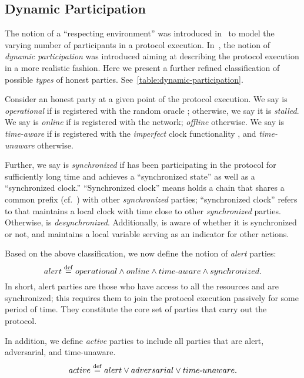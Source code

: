 \subsection{Dynamic Participation}
\label{subsec:dynamic-participation}

The notion of a ``respecting environment'' was introduced in~\cite{C:GarKiaLeo17} to model the varying number of participants in a protocol execution.
%
In~\cite{CCS:BGKRZ18,EC:BGKRZ21}, the notion of \emph{dynamic participation} was introduced aiming at describing the protocol execution in a more realistic fashion.
%
Here we present a further refined classification of possible \emph{types} of honest parties.
%
See~\cref{table:dynamic-participation}.



Consider an honest party \party at a given point of the protocol execution.
%
We say \party is \emph{operational} if \party is registered with the random oracle \funcRO; otherwise, we say it is \emph{stalled}.
%
We say \party is \emph{online} if \party is registered with the network; \emph{offline} otherwise.
%
We say \party is \emph{time-aware} if \party is registered with the \emph{imperfect} clock functionality \funcImpClock, and \emph{time-unaware} otherwise.

Further, we say \party is \emph{synchronized} if \party has been participating in the protocol for sufficiently long time and achieves a ``synchronized state'' as well as a ``synchronized clock.''
%
``Synchronized clock'' means \party holds a chain that shares a common prefix (cf.~\cite{EC:GarKiaLeo15}) with other \emph{synchronized} parties; ``synchronized clock'' refers to that \party maintains a local clock with time close to other \emph{synchronized} parties.
%
Otherwise, \party is \emph{desynchronized}.
%
Additionally, \party is aware of whether it is synchronized or not, and maintains a local variable \isSync serving as an indicator for other actions.

Based on the above classification, we now define the notion of \emph{alert} parties:
%
\[ alert \overset{\mathrm{def}}{=} operational \wedge online \wedge time\text{-}aware  \wedge synchronized. \]
%
In short, alert parties are those who have access to all the resources and are synchronized; this requires them to join the protocol execution passively for some period of time.
%
They constitute the core set of parties that carry out the protocol.

In addition, we define \emph{active} parties to include all parties that are alert, adversarial, and time-unaware.
%
\[ active \overset{\mathrm{def}}{=} alert \vee adversarial \vee time\text{-}unaware. \]

